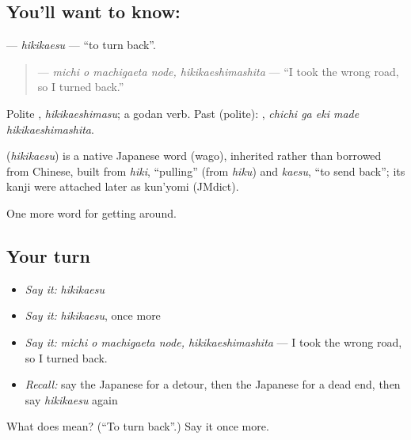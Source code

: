 \subsection*{You'll want to know: }
\textbf{} — \emph{hikikaesu} — \textquotedblleft{}to turn back\textquotedblright{}.

\begin{quote}
\textbf{ } — \emph{michi o machigaeta node, hikikaeshimashita} — \textquotedblleft{}I took the wrong road, so I turned back.\textquotedblright{}
\end{quote}

Polite \textbf{}, \emph{hikikaeshimasu}; a godan verb. Past (polite): \textbf{  }, \emph{chichi ga eki made hikikaeshimashita}.

\begin{cousinweb}
\textbf{} (\emph{hikikaesu}) is a native Japanese word (wago), inherited rather than borrowed from Chinese, built from \emph{hiki}, \textquotedblleft{}pulling\textquotedblright{} (from \emph{hiku}) and \emph{kaesu}, \textquotedblleft{}to send back\textquotedblright{}; its kanji were attached later as kun'yomi (JMdict).
\end{cousinweb}

\begin{grammarlens}[title={What you've built}]
One more word for getting around.
\end{grammarlens}

\subsection*{Your turn}
\begin{itemize}
\raggedright
  \item \emph{Say it:} \emph{hikikaesu}
  \item \emph{Say it:} \emph{hikikaesu}, once more
  \item \emph{Say it:} \emph{michi o machigaeta node, hikikaeshimashita} — I took the wrong road, so I turned back.
  \item \emph{Recall:} say the Japanese for a detour, then the Japanese for a dead end, then say \emph{hikikaesu} again
\end{itemize}

\begin{tcolorbox}[breakable,colback=teal!4,colframe=teal!35!black,title={Before you move on}]
What does  mean? (\textquotedblleft{}To turn back\textquotedblright{}.) Say it once more.
\end{tcolorbox}
